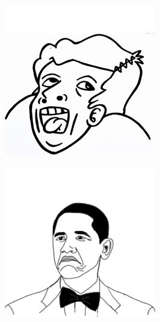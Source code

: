 \begin{multicols}{8}
\begin{center}
\includegraphics[width=\linewidth]{./IMG-GIT/MEMES/Meme-troll-Nicolas-Cage.jpg}
\end{center}

\begin{center}
\includegraphics[width=\linewidth]{./IMG-GIT/MEMES/meme-cara-Barack-Obama.jpg}  
\end{center}


\end{multicols}
